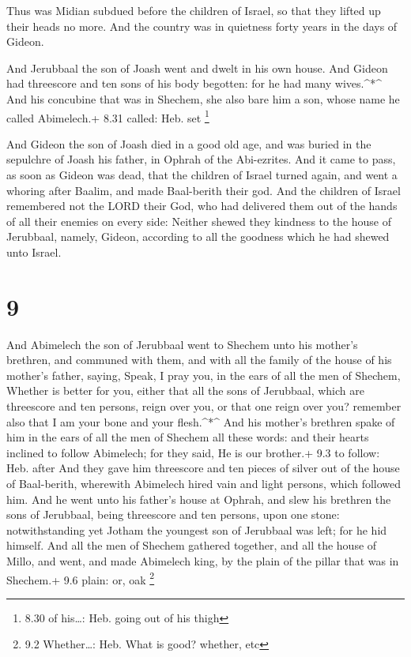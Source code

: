  Thus was Midian subdued before the children of Israel, so
that they lifted up their heads no more. And the country was in
quietness forty years in the days of Gideon.

 And Jerubbaal the son of Joash went and dwelt in his own
house.  And Gideon had threescore and ten sons of his body
begotten: for he had many wives.\^{}*\^{}  And his
concubine that was in Shechem, she also bare him a son, whose name he
called Abimelech.+ 8.31 called: Heb. set \footnote{8.30 of his\ldots:
  Heb. going out of his thigh}

 And Gideon the son of Joash died in a good old age, and
was buried in the sepulchre of Joash his father, in Ophrah of the
Abi-ezrites.  And it came to pass, as soon as Gideon was
dead, that the children of Israel turned again, and went a whoring after
Baalim, and made Baal-berith their god.  And the children
of Israel remembered not the LORD their God, who had delivered them out
of the hands of all their enemies on every side:  Neither
shewed they kindness to the house of Jerubbaal, namely, Gideon,
according to all the goodness which he had shewed unto Israel.

\hypertarget{section-8}{%
\section{9}\label{section-8}}

 And Abimelech the son of Jerubbaal went to Shechem unto his
mother's brethren, and communed with them, and with all the family of
the house of his mother's father, saying,  Speak, I pray
you, in the ears of all the men of Shechem, Whether is better for you,
either that all the sons of Jerubbaal, which are threescore and ten
persons, reign over you, or that one reign over you? remember also that
I am your bone and your flesh.\^{}*\^{}  And his mother's
brethren spake of him in the ears of all the men of Shechem all these
words: and their hearts inclined to follow Abimelech; for they said, He
is our brother.+ 9.3 to follow: Heb. after  And they gave
him threescore and ten pieces of silver out of the house of Baal-berith,
wherewith Abimelech hired vain and light persons, which followed him.
 And he went unto his father's house at Ophrah, and slew his
brethren the sons of Jerubbaal, being threescore and ten persons, upon
one stone: notwithstanding yet Jotham the youngest son of Jerubbaal was
left; for he hid himself.  And all the men of Shechem
gathered together, and all the house of Millo, and went, and made
Abimelech king, by the plain of the pillar that was in Shechem.+ 9.6
plain: or, oak \footnote{9.2 Whether\ldots: Heb. What is good? whether,
  etc}

